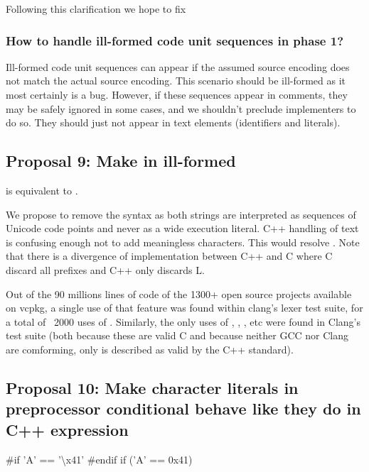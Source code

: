 \documentclass{wg21}
\begin{document}
Following this clarification we hope to fix 

\subsubsection{How to handle ill-formed code unit sequences in phase 1?}

Ill-formed code unit sequences can appear if the assumed source encoding does not match the actual source encoding.
This scenario should be ill-formed as it most certainly is a bug.
However, if these sequences appear in comments, they may be safely ignored in some cases, and we shouldn't preclude implementers to do so.
They should just not appear in text elements (identifiers and literals).


\subsection{Proposal 9: Make  in  ill-formed}

 is equivalent to .

We propose to remove the  syntax as both strings are interpreted as sequences of Unicode code points and never as a wide execution literal.
C++ handling of text is confusing enough not to add meaningless characters. This would resolve .
Note that there is a divergence of implementation between C++ and C where C discard all prefixes and C++ only discards L.

Out of the 90 millions lines of code of the 1300+ open source projects available on vcpkg, a single use of that feature was found within clang's lexer test suite, for a total of ~2000 uses of .
Similarly, the only uses of , , , etc were found in Clang's  test suite
(both because these are valid C and because neither GCC nor Clang are comforming, only  is described as valid by the C++ standard).


\subsection{Proposal 10: Make character literals in preprocessor conditional behave like they do in C++ expression}

\begin{colorblock}
#if 'A' == '\textbackslash x41'
#endif
if ('A' == 0x41){}
\end{colorblock}
\end{document}
